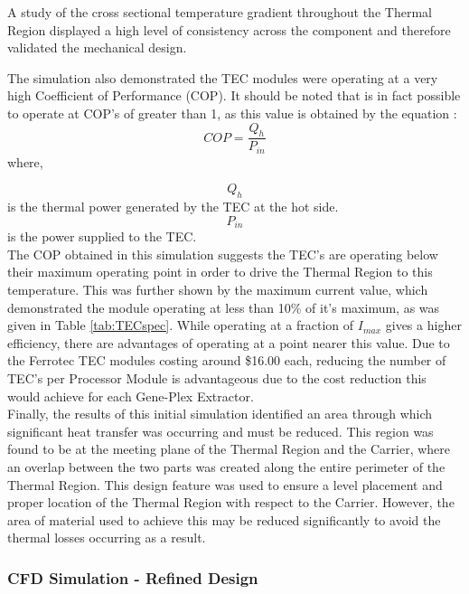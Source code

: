 A study of the cross sectional temperature gradient throughout the Thermal Region displayed a high level of consistency across the component and therefore validated the mechanical design.

The simulation also demonstrated the TEC modules were operating at a very high Coefficient of Performance (COP). It should be noted that is in fact possible to operate at COP's of greater than 1, as this value is obtained by the equation \cite{Ferroteceff}:
\begin{equation}
COP = \frac{Q_h}{P_{in}}
\end{equation}
where,

$$Q_h$$ is the thermal power generated by the TEC at the hot side.\\
$$P_{in}$$ is the power supplied to the TEC.\\

The COP obtained in this simulation suggests the TEC's are operating below their maximum operating point in order to drive the Thermal Region to this temperature. This was further shown by the maximum current value, which demonstrated the module operating at less than 10\% of it's maximum, as was given in Table \ref{tab:TECspec}. While operating at a fraction of $I_{max}$ gives a higher efficiency, there are advantages of operating at a point nearer this value. Due to the Ferrotec TEC modules costing around \$16.00 each, reducing the number of TEC's per Processor Module is advantageous due to the cost reduction this would achieve for each Gene-Plex Extractor.\\

Finally, the results of this initial simulation identified an area through which significant heat transfer was occurring and must be reduced. This region was found to be at the meeting plane of the Thermal Region and the Carrier, where an overlap between the two parts was created along the entire perimeter of the Thermal Region. This design feature was used to ensure a level placement and proper location of the Thermal Region with respect to the Carrier. However, the area of material used to achieve this may be reduced significantly to avoid the thermal losses occurring as a result.\\

\subsubsection{CFD Simulation - Refined Design}
\label{refinedcfd}

